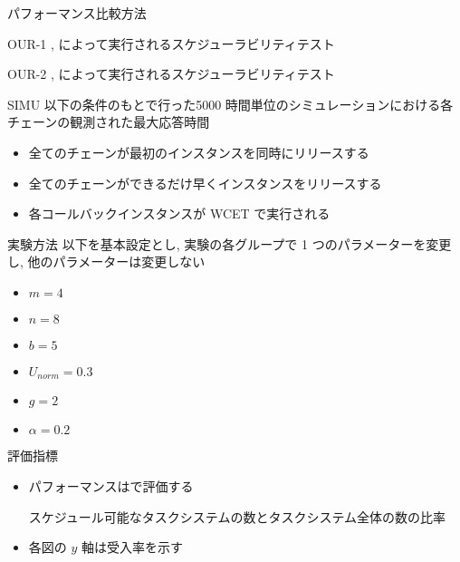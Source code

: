\begin{frame}{パフォーマンス比較方法}
    \vspace{1mm}
    \begin{block}{OUR-1}
        ,  によって実行されるスケジューラビリティテスト
    \end{block}
    \begin{block}{OUR-2}
        ,  によって実行されるスケジューラビリティテスト
    \end{block}
    \begin{block}{SIMU}
        以下の条件のもとで行った5000 時間単位のシミュレーションにおける各チェーンの観測された最大応答時間
        \setlength{\linewidth}{0.98\columnwidth}
        \footnotesize
        \begin{itemize}
            \item 全てのチェーンが最初のインスタンスを同時にリリースする
            \item 全てのチェーンができるだけ早くインスタンスをリリースする
            \item 各コールバックインスタンスが WCET で実行される
        \end{itemize}
    \end{block}
\end{frame}

\begin{frame}{実験方法}
    以下を基本設定とし, 実験の各グループで 1 つのパラメーターを変更し, 他のパラメーターは変更しない
    \begin{itemize}
        \item $m=4$
        \item $n=8$
        \item $b=5$
        \item $U_{n o r m}=0.3$
        \item $g=2$
        \item $\alpha=0.2$
    \end{itemize}
\end{frame}

\begin{frame}{評価指標}
    \begin{itemize}
        \item パフォーマンスはで評価する
              \begin{definition}[受入率]
                  スケジュール可能なタスクシステムの数とタスクシステム全体の数の比率
              \end{definition}
              \vspace{5mm}
        \item 各図の $y$ 軸は受入率を示す
    \end{itemize}
\end{frame}

